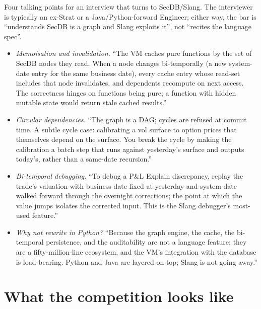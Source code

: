 \begin{gsbox}
Four talking points for an interview that turns to SecDB/Slang.
The interviewer is typically an ex-Strat or a Java/Python-forward
Engineer; either way, the bar is ``understands SecDB is a graph
and Slang exploits it'', not ``recites the language spec''.
\begin{itemize}
  \item \emph{Memoisation and invalidation.}  ``The VM caches pure
    functions by the set of SecDB nodes they read.  When a node
    changes bi-temporally (a new system-date entry for the same
    business date), every cache entry whose read-set includes
    that node invalidates, and dependents recompute on next
    access.  The correctness hinges on functions being pure; a
    function with hidden mutable state would return stale cached
    results.''
  \item \emph{Circular dependencies.}  ``The graph is a DAG;
    cycles are refused at commit time.  A subtle cycle case:
    calibrating a vol surface to option prices that themselves
    depend on the surface.  You break the cycle by making the
    calibration a batch step that runs against yesterday's
    surface and outputs today's, rather than a same-date
    recursion.''
  \item \emph{Bi-temporal debugging.}  ``To debug a P\&L Explain
    discrepancy, replay the trade's valuation with business date
    fixed at yesterday and system date walked forward through the
    overnight corrections; the point at which the value jumps
    isolates the corrected input.  This is the Slang debugger's
    most-used feature.''
  \item \emph{Why not rewrite in Python?}  ``Because the graph
    engine, the cache, the bi-temporal persistence, and the
    auditability are not a language feature; they are a
    fifty-million-line ecosystem, and the VM's integration with
    the database is load-bearing.  Python and Java are layered on
    top; Slang is not going away.''
\end{itemize}
\end{gsbox}

\section{What the competition looks like}
\label{sec:competition}

